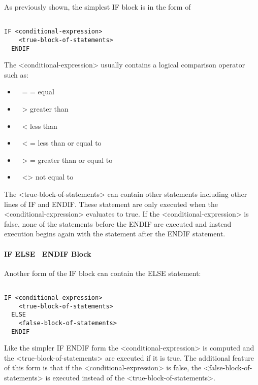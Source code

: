 As previously shown, the simplest IF block is in the form of

\begin{lstlisting}

IF <conditional-expression>
    <true-block-of-statements>
  ENDIF
\end{lstlisting}

The \textless{}conditional-expression\textgreater{} usually contains a logical comparison operator such as:

\begin{itemize}
\item
  ~ = = equal
\item
  ~ \textgreater{} greater than
\item
  ~ \textless{} less than
\item
  ~ \textless{} = less than or equal to
\item
  ~ \textgreater{} = greater than or equal to
\item
  ~ \textless{}\textgreater{} not equal to
\end{itemize}

The \textless{}true-block-of-statements\textgreater{} can contain other statements including other lines of IF and ENDIF. These statement are only executed when the \textless{}conditional-expression\textgreater{} evaluates to true. If the \textless{}conditional-expression\textgreater{} is false, none of the statements before the ENDIF are executed and instead execution begins again with the statement after the ENDIF statement.

\paragraph{IF ELSE~ ENDIF Block}\label{if-else-endif-block}

Another form of the IF block can contain the ELSE statement:

\begin{lstlisting}

IF <conditional-expression>
    <true-block-of-statements>
  ELSE
    <false-block-of-statements>
  ENDIF
\end{lstlisting}

Like the simpler IF ENDIF form the \textless{}conditional-expression\textgreater{} is computed and the \textless{}true-block-of-statements\textgreater{} are executed if it is true. The additional feature of this form is that if the \textless{}conditional-expression\textgreater{} is false, the \textless{}false-block-of-statements\textgreater{} is executed instead of the \textless{}true-block-of-statements\textgreater{}.

